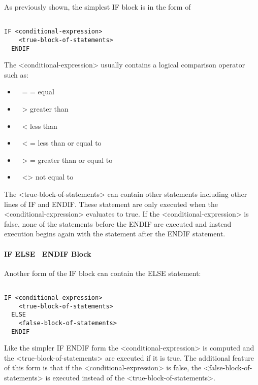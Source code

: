 As previously shown, the simplest IF block is in the form of

\begin{lstlisting}

IF <conditional-expression>
    <true-block-of-statements>
  ENDIF
\end{lstlisting}

The \textless{}conditional-expression\textgreater{} usually contains a logical comparison operator such as:

\begin{itemize}
\item
  ~ = = equal
\item
  ~ \textgreater{} greater than
\item
  ~ \textless{} less than
\item
  ~ \textless{} = less than or equal to
\item
  ~ \textgreater{} = greater than or equal to
\item
  ~ \textless{}\textgreater{} not equal to
\end{itemize}

The \textless{}true-block-of-statements\textgreater{} can contain other statements including other lines of IF and ENDIF. These statement are only executed when the \textless{}conditional-expression\textgreater{} evaluates to true. If the \textless{}conditional-expression\textgreater{} is false, none of the statements before the ENDIF are executed and instead execution begins again with the statement after the ENDIF statement.

\paragraph{IF ELSE~ ENDIF Block}\label{if-else-endif-block}

Another form of the IF block can contain the ELSE statement:

\begin{lstlisting}

IF <conditional-expression>
    <true-block-of-statements>
  ELSE
    <false-block-of-statements>
  ENDIF
\end{lstlisting}

Like the simpler IF ENDIF form the \textless{}conditional-expression\textgreater{} is computed and the \textless{}true-block-of-statements\textgreater{} are executed if it is true. The additional feature of this form is that if the \textless{}conditional-expression\textgreater{} is false, the \textless{}false-block-of-statements\textgreater{} is executed instead of the \textless{}true-block-of-statements\textgreater{}.

